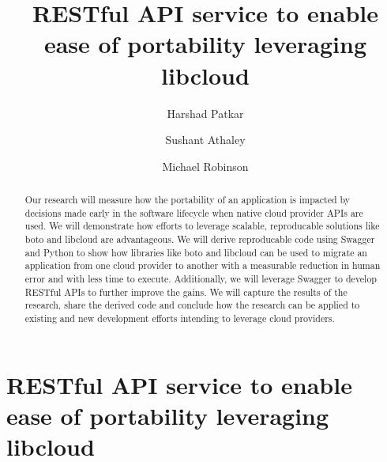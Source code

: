 
\title{RESTful API service to enable ease of portability leveraging libcloud}


\author{Harshad Patkar}

\author{Sushant Athaley}

\author{Michael Robinson}


\renewcommand{\shortauthors}{H. Pitkar, S. Athaley, M. Robinson}


\begin{abstract}
Our research will measure how the portability of an application is
impacted by decisions made early in the software lifecycle when native
cloud provider APIs are used. We will demonstrate how efforts to
leverage scalable, reproducable solutions like boto and libcloud are
advantageous. We will derive reproducable code using Swagger and Python
to show how libraries like boto and libcloud can be used to migrate an
application from one cloud provider to another with a measurable
reduction in human error and with less time to execute. Additionally, we
will leverage Swagger to develop RESTful APIs to further improve the
gains. We will capture the results of the research, share the derived
code and conclude how the research can be applied to existing and new
development efforts intending to leverage cloud providers. 
\end{abstract}



\maketitle

\section{RESTful API service to enable ease of portability leveraging libcloud}
\label{restful-api-service-to-enable-ease-of-portability-leveraging-libcloud}


